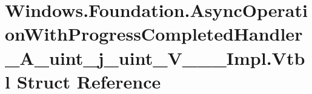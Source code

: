 \hypertarget{struct_windows_1_1_foundation_1_1_async_operation_with_progress_completed_handler___a__uint__j__uint___v_______impl_1_1_vtbl}{}\section{Windows.\+Foundation.\+Async\+Operation\+With\+Progress\+Completed\+Handler\+\_\+\+A\+\_\+uint\+\_\+j\+\_\+uint\+\_\+\+V\+\_\+\+\_\+\+\_\+\+Impl.\+Vtbl Struct Reference}
\label{struct_windows_1_1_foundation_1_1_async_operation_with_progress_completed_handler___a__uint__j__uint___v_______impl_1_1_vtbl}
